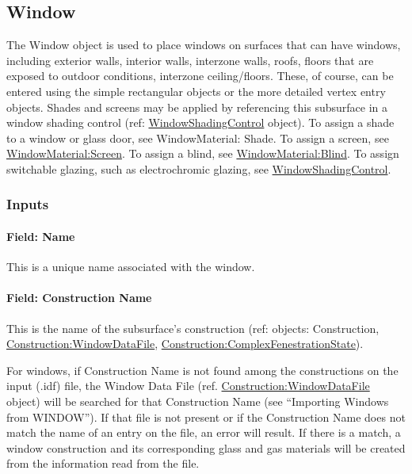 \subsection{Window}\label{window}

The Window object is used to place windows on surfaces that can have windows, including exterior walls, interior walls, interzone walls, roofs, floors that are exposed to outdoor conditions, interzone ceiling/floors. These, of course, can be entered using the simple rectangular objects or the more detailed vertex entry objects. Shades and screens may be applied by referencing this subsurface in a window shading control (ref: \hyperref[windowpropertyshadingcontrol]{WindowShadingControl} object). To assign a shade to a window or glass door, see WindowMaterial: Shade. To assign a screen, see \hyperref[windowmaterialscreen]{WindowMaterial:Screen}. To assign a blind, see \hyperref[windowmaterialblind]{WindowMaterial:Blind}. To assign switchable glazing, such as electrochromic glazing, see \hyperref[windowpropertyshadingcontrol]{WindowShadingControl}.


\subsubsection{Inputs}\label{inputs-14-016}

\paragraph{Field: Name}\label{field-name-10-018}

This is a unique name associated with the window.

\paragraph{Field: Construction Name}\label{field-construction-name-10}

This is the name of the subsurface's construction (ref: objects: Construction, \hyperref[constructionwindowdatafile]{Construction:WindowDataFile}, \hyperref[constructioncomplexfenestrationstate]{Construction:ComplexFenestrationState}).

For windows, if Construction Name is not found among the constructions on the input (.idf) file, the Window Data File (ref. \hyperref[constructionwindowdatafile]{Construction:WindowDataFile} object) will be searched for that Construction Name (see ``Importing Windows from WINDOW''). If that file is not present or if the Construction Name does not match the name of an entry on the file, an error will result. If there is a match, a window construction and its corresponding glass and gas materials will be created from the information read from the file.

